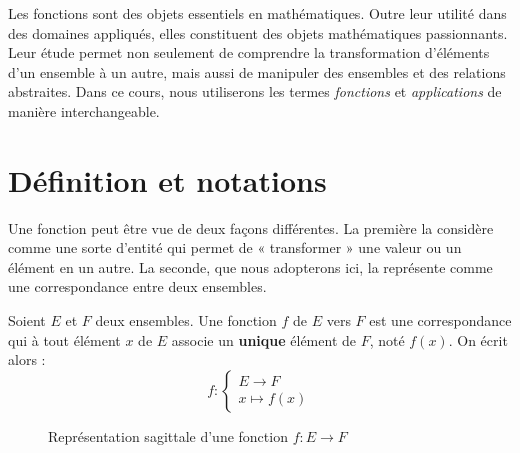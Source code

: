 
Les fonctions sont des objets essentiels en mathématiques. Outre leur utilité dans des domaines appliqués, elles constituent des objets mathématiques passionnants. Leur étude permet non seulement de comprendre la transformation d’éléments d’un ensemble à un autre, mais aussi de manipuler des ensembles et des relations abstraites. Dans ce cours, nous utiliserons les termes \emph{fonctions} et \emph{applications} de manière interchangeable.


\section{Définition et notations}

Une fonction peut être vue de deux façons différentes. La première la considère comme une sorte d’entité qui permet de « transformer » une valeur ou un élément en un autre. La seconde, que nous adopterons ici, la représente comme une correspondance entre deux ensembles.

\begin{definition}[Application]
    Soient $E$ et $F$ deux ensembles. Une fonction $f$ de $E$ vers $F$ est une correspondance qui à tout élément $x$ de $E$ associe un \textbf{unique} élément de $F$, noté $f(x)$. On écrit alors : 
    \[
        f : 
        \begin{cases}
            E \longrightarrow F \\ 
            x \longmapsto f(x)
        \end{cases}
    \]
\end{definition}

\begin{figure}[h!]
    \centering
    \caption{Représentation sagittale d'une fonction $f : E \to F$}
\end{figure}


